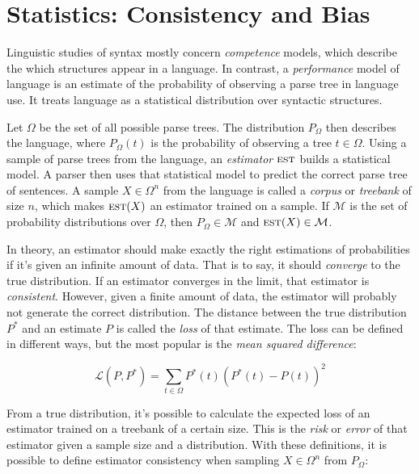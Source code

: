 \section{Statistics: Consistency and Bias}\label{sec:Statistics}



Linguistic studies of syntax mostly concern \emph{competence} models, which describe the which structures appear in a language. In contrast, a \emph{performance} model of language is an estimate of the probability of observing a parse tree in language use. It treats language as a statistical distribution over syntactic structures.

Let $\Omega$ be the set of all possible parse trees. The distribution $P_\Omega$ then describes the language, where $P_\Omega(t)$ is the probability of observing a tree $t \in \Omega$. Using a sample of parse trees from the language, an \emph{estimator} $\textsc{est}$ builds a statistical model. A parser then uses that statistical model to predict the correct parse tree of sentences.
A sample $X \in \Omega^n$ from the language is called a \emph{corpus} or \emph{treebank} of size $n$, which makes $\textsc{est}(X)$ an estimator trained on a sample. If $\mathcal{M}$ is the set of probability distributions over $\Omega$, then $P_\Omega \in \mathcal{M}$ and $\textsc{est}(X) \in \mathcal{M}$.

In theory, an estimator should make exactly the right estimations of probabilities if it's given an infinite amount of data. That is to say, it should \emph{converge} to the true distribution. If an estimator converges in the limit, that estimator is \emph{consistent}.
However, given a finite amount of data, the estimator will probably not generate the correct distribution. The distance between the true distribution $P^*$ and an estimate $P$ is called the \emph{loss} of that estimate. The loss can be defined in different ways, but the most popular is the \emph{mean squared difference}:

$$ \mathcal{L}(P, P^*) =  \sum_{t \in \Omega} P^*(t) (P^*(t)-P(t))^2$$

From a true distribution, it's possible to calculate the expected loss of an estimator trained on a treebank of a certain size. This is the \emph{risk} or \emph{error} of that estimator given a sample size and a distribution. 
With these definitions, it is possible to define estimator consistency when sampling $X \in \Omega^n$ from $P_\Omega$:

